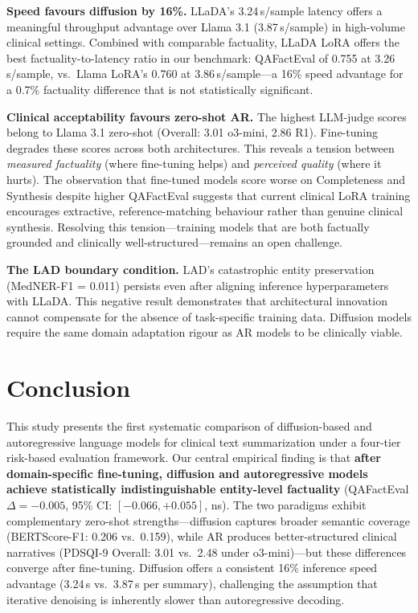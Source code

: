 \documentclass[11pt]{article}
\begin{document}
\textbf{Speed favours diffusion by 16\%.} LLaDA's 3.24\,s/sample latency
offers a meaningful throughput advantage over Llama 3.1 (3.87\,s/sample)
in high-volume clinical settings. Combined with comparable factuality,
LLaDA LoRA offers the best factuality-to-latency ratio in our benchmark:
QAFactEval of 0.755 at 3.26\,s/sample, vs.\ Llama LoRA's 0.760 at
3.86\,s/sample---a 16\% speed advantage for a 0.7\% factuality difference
that is not statistically significant.

\textbf{Clinical acceptability favours zero-shot AR.} The highest LLM-judge
scores belong to Llama 3.1 zero-shot (Overall: 3.01 o3-mini, 2.86 R1).
Fine-tuning degrades these scores across both architectures. This reveals a
tension between \emph{measured factuality} (where fine-tuning helps) and
\emph{perceived quality} (where it hurts). The observation that fine-tuned
models score worse on Completeness and Synthesis despite higher QAFactEval
suggests that current clinical LoRA training encourages extractive,
reference-matching behaviour rather than genuine clinical synthesis.
Resolving this tension---training models that are both factually grounded and
clinically well-structured---remains an open challenge.

\textbf{The LAD boundary condition.} LAD's catastrophic entity preservation
(MedNER-F1 = 0.011) persists even after aligning inference hyperparameters
with LLaDA. This negative result demonstrates that architectural innovation
cannot compensate for the absence of task-specific training data. Diffusion
models require the same domain adaptation rigour as AR models to be
clinically viable.

\section{Conclusion}
\label{sec:conclusion}

This study presents the first systematic comparison of diffusion-based and
autoregressive language models for clinical text summarization under a
four-tier risk-based evaluation framework. Our central empirical finding is
that \textbf{after domain-specific fine-tuning, diffusion and autoregressive
models achieve statistically indistinguishable entity-level factuality}
(QAFactEval $\Delta = -0.005$, 95\% CI: $[-0.066, +0.055]$,
ns). The two paradigms exhibit complementary zero-shot strengths---diffusion
captures broader semantic coverage (BERTScore-F1: 0.206 vs.\ 0.159), while
AR produces better-structured clinical narratives (PDSQI-9 Overall: 3.01
vs.\ 2.48 under o3-mini)---but these differences converge after fine-tuning.
Diffusion offers a consistent 16\% inference speed advantage (3.24\,s vs.\
3.87\,s per summary), challenging the assumption that iterative denoising is
inherently slower than autoregressive decoding.
\end{document}
